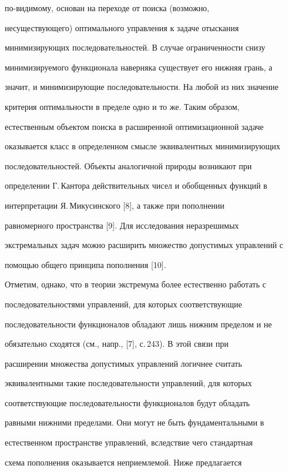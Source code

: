 по-видимому, основан на переходе от поиска (возможно,


несуществующего) оптимального управления к задаче отыскания 


минимизирующих последовательностей. В случае ограниченности снизу 


минимизируемого функционала наверняка существует его нижняя грань, а 


значит, и минимизирующие последовательности. На любой из них значение 


критерия оптимальности в пределе одно и то же. Таким образом, 


естественным объектом поиска в расширенной оптимизационной задаче 


оказывается класс в определенном смысле эквивалентных минимизирующих 


последовательностей. Объекты аналогичной природы возникают при 


определении Г.\,Кантора действительных чисел и обобщенных функций в 


интерпретации Я.\,Микусинского [8], а также при пополнении 


равномерного пространства [9]. Для исследования неразрешимых 


экстремальных задач можно расширить множество допустимых управлений с 


помощью общего принципа пополнения [10]. 


 


Отметим, однако, что в теории экстремума более естественно работать с 


последовательностями управлений, для которых соответствующие 


последовательности функционалов обладают лишь нижним пределом и не 


обязательно сходятся (см., напр., [7], с.\,243). В этой связи при 


расширении множества допустимых управлений логичнее считать 


эквивалентными такие последовательности управлений, для которых 


соответствующие последовательности функционалов будут обладать 


равными нижними пределами. Они могут не быть фундаментальными в 


естественном пространстве управлений, вследствие чего стандартная 


схема пополнения оказывается неприемлемой. Ниже предлагается 


